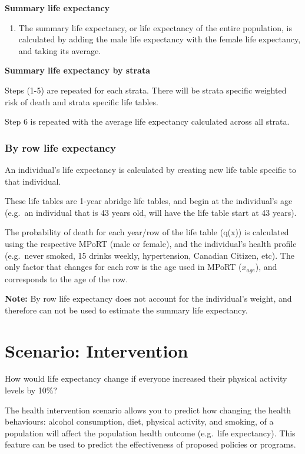 \documentclass[]{book}
\providecommand{\tightlist}{%
  \setlength{\itemsep}{0pt}\setlength{\parskip}{0pt}}
\begin{document}
\textbf{Summary life expectancy}

\begin{enumerate}
\def\labelenumi{\arabic{enumi}.}
\setcounter{enumi}{5}
\tightlist
\item
  The summary life expectancy, or life expectancy of the entire
  population, is calculated by adding the male life expectancy with the
  female life expectancy, and taking its average.
\end{enumerate}

\textbf{Summary life expectancy by strata}

Steps (1-5) are repeated for each strata. There will be strata specific
weighted risk of death and strata specific life tables.

Step 6 is repeated with the average life expectancy calculated across
all strata.

\subsubsection{By row life expectancy}\label{by-row-life-expectancy}

An individual's life expectancy is calculated by creating new life table
specific to that individual.

These life tables are 1-year abridge life tables, and begin at the
individual's age (e.g.~an individual that is 43 years old, will have the
life table start at 43 years).

The probability of death for each year/row of the life table (q(x)) is
calculated using the respective MPoRT (male or female), and the
individual's health profile (e.g.~never smoked, 15 drinks weekly,
hypertension, Canadian Citizen, etc). The only factor that changes for
each row is the age used in MPoRT (\(x_{age}\)), and corresponds to the
age of the row.

\textbf{Note:} By row life expectancy does not account for the
individual's weight, and therefore can not be used to estimate the
summary life expectancy.

\section{Scenario: Intervention}\label{scenario-intervention}

How would life expectancy change if everyone increased their physical
activity levels by 10\%?

The health intervention scenario allows you to predict how changing the
health behaviours: alcohol consumption, diet, physical activity, and
smoking, of a population will affect the population health outcome
(e.g.~life expectancy). This feature can be used to predict the
effectiveness of proposed policies or programs.
\end{document}
